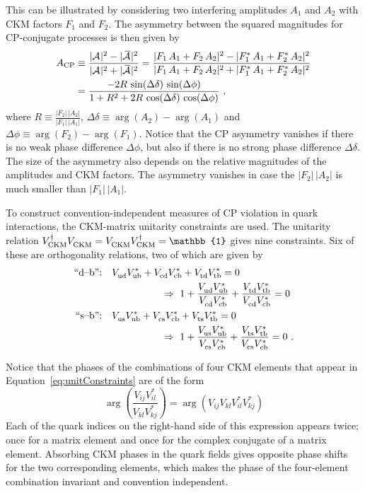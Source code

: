 This can be illustrated by considering two interfering amplitudes $A_1$ and $A_2$ with CKM factors $F_1$ and $F_2$. The asymmetry between
the squared magnitudes for CP-conjugate processes is then given by
\begin{equation}
  \label{eq:interference}
  \begin{split}
    A_\text{CP} &\equiv \frac{|\Af[]|^2 - |\Abarf[]|^2}{|\Af[]|^2 + |\Abarf[]|^2}
                 = \frac{|F_1\,A_1 + F_2\,A_2|^2 - |F_1^*\,A_1 + F_2^*\,A_2|^2}{|F_1\,A_1 + F_2\,A_2|^2 + |F_1^*\,A_1 + F_2^*\,A_2|^2} \\
                &= \frac{-2 R\, \sin(\Delta\delta)\, \sin(\Delta\phi)}{1 + R^2 + 2 R\, \cos(\Delta\delta)\, \cos(\Delta\phi)}
                   \ ,
  \end{split}
\end{equation}
where $R\equiv\frac{|F_2|\,|A_2|}{|F_1|\,|A_1|}$, $\Delta\delta\equiv\arg(A_2)-\arg(A_1)$ and $\Delta\phi\equiv\arg(F_2)-\arg(F_1)$. Notice
that the CP asymmetry vanishes if there is no weak phase difference $\Delta\phi$, but also if there is no strong phase difference
$\Delta\delta$. The size of the asymmetry also depends on the relative magnitudes of the amplitudes and CKM factors. The asymmetry vanishes
in case the $|F_2|\,|A_2|$ is much smaller than $|F_1|\,|A_1|$.

To construct convention-independent measures of CP violation in quark interactions, the CKM-matrix unitarity constraints are used. The
unitarity relation $\VCKM[\dagger]\VCKM = \VCKM\VCKM[\dagger] = \mathbb{1}$ gives nine constraints. Six of these are orthogonality
relations, two of which are given by
\begin{subequations}
  \label{eq:unitConstraints}
  \begin{align}
    \text{``d--b'':} & \quad \Vud\Vub[*] + \Vcd\Vcb[*] + \Vtd\Vtb[*] = 0 \nonumber \\
    \label{eq:unitConstraints_d}
    &\qquad\qquad\qquad \Rightarrow\ 1 + \frac{\Vud\Vub[*]}{\Vcd\Vcb[*]} + \frac{\Vtd\Vtb[*]}{\Vcd\Vcb[*]} = 0 \\
    \text{``s--b'':} & \quad \Vus\Vub[*] + \Vcs\Vcb[*] + \Vts\Vtb[*] = 0 \nonumber \\
    \label{eq:unitConstraints_s}
    &\qquad\qquad\qquad \Rightarrow\ 1 + \frac{\Vus\Vub[*]}{\Vcs\Vcb[*]} + \frac{\Vts\Vtb[*]}{\Vcs\Vcb[*]} = 0 \ .
  \end{align}
\end{subequations}

Notice that the phases of the combinations of four CKM elements that appear in Equation~\ref{eq:unitConstraints} are of the form
\[
  \arg\left( \frac{V^{\phantom{*}}_{ij} V^{*}_{il}}{V^{\phantom{*}}_{kl} V^{*}_{kj}} \right)
    = \arg(V^{\phantom{*}}_{ij} V^{\phantom{*}}_{kl} V^{*}_{il} V^{*}_{kj})
\]
Each of the quark indices on the right-hand side of this expression appears twice; once for a matrix element and once for the complex
conjugate of a matrix element. Absorbing CKM phases in the quark fields gives opposite phase shifts for the two corresponding elements,
which makes the phase of the four-element combination invariant and convention independent.

